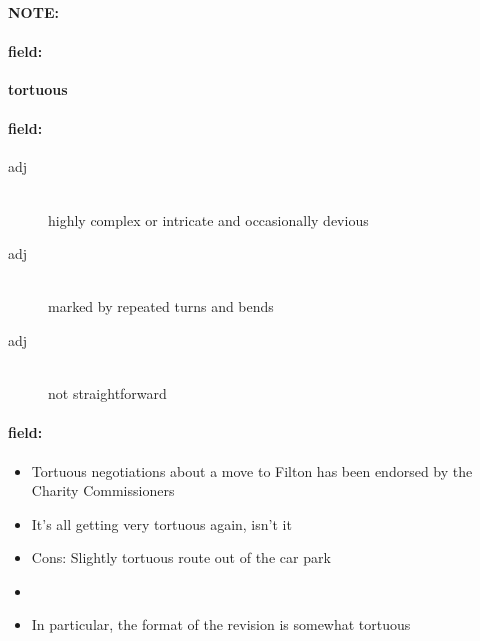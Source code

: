 \documentclass[12pt]{article}
\newenvironment{note}{\paragraph{NOTE:}}{}
\newenvironment{field}{\paragraph{field:}}{}
\begin{document}
\begin{note}
\begin{field}
\textbf{\large tortuous}
\end{field}


\begin{field}
\begin{description}
\item[adj] \hfill \\ 
highly complex or intricate and occasionally devious

\item[adj] \hfill \\ 
marked by repeated turns and bends

\item[adj] \hfill \\ 
not straightforward

\end{description}
\end{field}

\begin{field}
\begin{itemize}
\item Tortuous negotiations about a move to Filton has been endorsed by the Charity Commissioners
\item It's all getting very tortuous again, isn't it
\item Cons: Slightly tortuous route out of the car park
\item 
\item In particular, the format of the revision is somewhat tortuous
\end{itemize}
\end{field}
\end{note}
\end{document}
